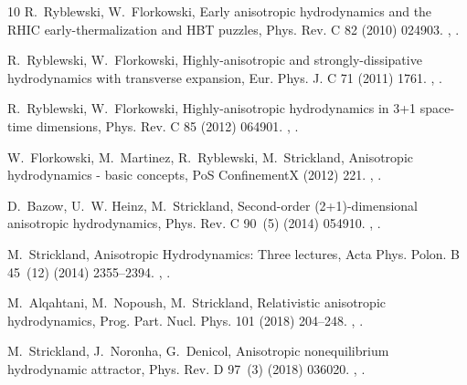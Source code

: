 \documentclass[preprint,12pt]{elsarticle}
\begin{document}
\begin{thebibliography}{10}
R.~Ryblewski, W.~Florkowski, {Early anisotropic hydrodynamics and the RHIC
  early-thermalization and HBT puzzles}, Phys. Rev. C 82 (2010) 024903.
\newblock \href {http://arxiv.org/abs/1004.1594} {},
  \href {https://doi.org/10.1103/PhysRevC.82.024903}
  {}.

R.~Ryblewski, W.~Florkowski, {Highly-anisotropic and strongly-dissipative
  hydrodynamics with transverse expansion}, Eur. Phys. J. C 71 (2011) 1761.
\newblock \href {http://arxiv.org/abs/1103.1260} {},
  \href {https://doi.org/10.1140/epjc/s10052-011-1761-8}
  {}.

R.~Ryblewski, W.~Florkowski, {Highly-anisotropic hydrodynamics in 3+1
  space-time dimensions}, Phys. Rev. C 85 (2012) 064901.
\newblock \href {http://arxiv.org/abs/1204.2624} {},
  \href {https://doi.org/10.1103/PhysRevC.85.064901}
  {}.

W.~Florkowski, M.~Martinez, R.~Ryblewski, M.~Strickland, {Anisotropic
  hydrodynamics - basic concepts}, PoS ConfinementX (2012) 221.
\newblock \href {http://arxiv.org/abs/1301.7539} {},
  \href {https://doi.org/10.22323/1.171.0221} {}.

D.~Bazow, U.~W. Heinz, M.~Strickland, {Second-order (2+1)-dimensional
  anisotropic hydrodynamics}, Phys. Rev. C 90~(5) (2014) 054910.
\newblock \href {http://arxiv.org/abs/1311.6720} {},
  \href {https://doi.org/10.1103/PhysRevC.90.054910}
  {}.

M.~Strickland, {Anisotropic Hydrodynamics: Three lectures}, Acta Phys. Polon. B
  45~(12) (2014) 2355--2394.
\newblock \href {http://arxiv.org/abs/1410.5786} {},
  \href {https://doi.org/10.5506/APhysPolB.45.2355}
  {}.

M.~Alqahtani, M.~Nopoush, M.~Strickland, {Relativistic anisotropic
  hydrodynamics}, Prog. Part. Nucl. Phys. 101 (2018) 204--248.
\newblock \href {http://arxiv.org/abs/1712.03282} {},
  \href {https://doi.org/10.1016/j.ppnp.2018.05.004}
  {}.

M.~Strickland, J.~Noronha, G.~Denicol, {Anisotropic nonequilibrium hydrodynamic
  attractor}, Phys. Rev. D 97~(3) (2018) 036020.
\newblock \href {http://arxiv.org/abs/1709.06644} {},
  \href {https://doi.org/10.1103/PhysRevD.97.036020}
  {}.


\end{thebibliography}
\end{document}
